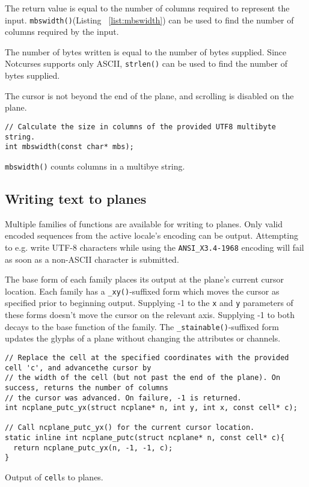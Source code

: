 \begin{denseitemize}
\item{The return value is equal to the number of columns required to represent the input.
    \texttt{mbswidth()}(Listing ~\ref{list:mbswidth}) can be used to find the number of columns required by
    the input.}
\item{The number of bytes written is equal to the number of bytes supplied. Since Notcurses
   supports only ASCII, \texttt{strlen()} can be used to find the number of
   bytes supplied.}
\item{The cursor is not beyond the end of the plane, and scrolling is disabled
 on the plane.}
\end{denseitemize}

\begin{listing}[!htb]
\begin{verbatim}
// Calculate the size in columns of the provided UTF8 multibyte string.
int mbswidth(const char* mbs);
\end{verbatim}
\caption{\texttt{mbswidth()} counts columns in a multibye string.}
\label{list:mbswidth}
\end{listing}

\subsection{Writing text to planes}
\label{sec:outputtext}

Multiple families of functions are available for writing to planes. Only valid
encoded sequences from the active locale's encoding can be output. Attempting
to e.g. write UTF-8 characters while using the \texttt{ANSI\_X3.4-1968} encoding
will fail as soon as a non-ASCII character is submitted.

The base form of each family places its output at the plane's current cursor
location. Each family has a \texttt{\_xy()}-suffixed form which moves the
cursor as specified prior to beginning output. Supplying -1 to the \texttt{x}
and \texttt{y} parameters of these forms doesn't move the cursor on the
relevant axis. Supplying -1 to both decays to the base function of the family.
The \texttt{\_stainable()}-suffixed form updates the glyphs of a plane without
changing the attributes or channels.

\begin{listing}[!htb]
\begin{verbatim}
// Replace the cell at the specified coordinates with the provided cell 'c', and advancethe cursor by
// the width of the cell (but not past the end of the plane). On success, returns the number of columns
// the cursor was advanced. On failure, -1 is returned.
int ncplane_putc_yx(struct ncplane* n, int y, int x, const cell* c);

// Call ncplane_putc_yx() for the current cursor location.
static inline int ncplane_putc(struct ncplane* n, const cell* c){
  return ncplane_putc_yx(n, -1, -1, c);
}
\end{verbatim}
\caption{Output of \texttt{cell}s to planes.}
\label{list:putcell}
\end{listing}

